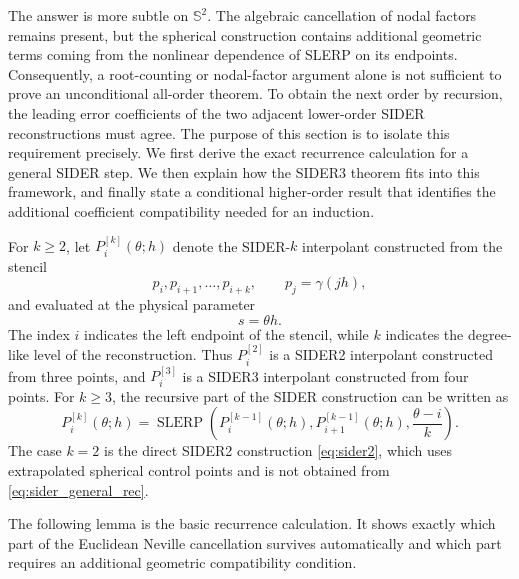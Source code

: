 \documentclass[a4paper,11pt]{article}
\newcommand{\bS}{\mathbb{S}}
\newcommand{\SLERP}{\operatorname{SLERP}}
\numberwithin{equation}{section}
\begin{document}
The answer is more subtle on \(\bS^2\).  The algebraic cancellation of nodal
factors remains present, but the spherical construction contains additional
geometric terms coming from the nonlinear dependence of SLERP on its endpoints.
Consequently, a root-counting or nodal-factor argument alone is not sufficient
to prove an unconditional all-order theorem.  To obtain the next order by
recursion, the leading error coefficients of the two adjacent lower-order
SIDER reconstructions must agree.  The purpose of this section is to isolate
this requirement precisely.  We first derive the exact recurrence calculation
for a general SIDER step.  We then explain how the SIDER3 theorem fits into
this framework, and finally state a conditional higher-order result that
identifies the additional coefficient compatibility needed for an induction.

For \(k\geq2\), let \(P_i^{[k]}(\theta;h)\) denote the SIDER-\(k\)
interpolant constructed from the stencil
\[
        p_i,p_{i+1},\ldots,p_{i+k},
        \qquad p_j=\gamma(jh),
\]
and evaluated at the physical parameter
\[
        s=\theta h.
\]
The index \(i\) indicates the left endpoint of the stencil, while \(k\)
indicates the degree-like level of the reconstruction.  Thus \(P_i^{[2]}\) is
a SIDER2 interpolant constructed from three points, and \(P_i^{[3]}\) is a
SIDER3 interpolant constructed from four points.  For \(k\geq3\), the
recursive part of the SIDER construction can be written as
\begin{equation}
\label{eq:sider_general_rec}
P_i^{[k]}(\theta;h)
=
\SLERP\!\left(
        P_i^{[k-1]}(\theta;h),
        P_{i+1}^{[k-1]}(\theta;h),
        \frac{\theta-i}{k}
       \right).
\end{equation}
The case \(k=2\) is the direct SIDER2 construction
\eqref{eq:sider2}, which uses extrapolated spherical control points and is not
obtained from \eqref{eq:sider_general_rec}.

The following lemma is the basic recurrence calculation.  It shows exactly
which part of the Euclidean Neville cancellation survives automatically and
which part requires an additional geometric compatibility condition.
\end{document}
